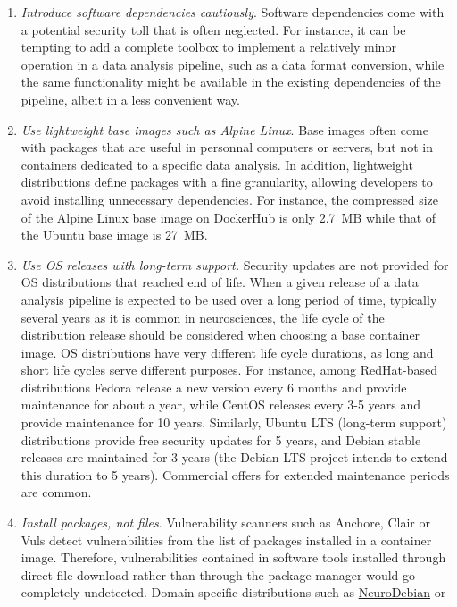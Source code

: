 \documentclass[a4paper,num-refs]{oup-contemporary}
\begin{document}
\begin{enumerate}[leftmargin=0pt,itemindent=*]
\item \emph{Introduce software dependencies cautiously}. Software
dependencies come with a potential security toll that is often neglected.
For instance, it can be tempting to add a complete toolbox to implement a
relatively minor operation in a data analysis pipeline, such as a data
format conversion, while the same functionality might be available in the
existing dependencies of the pipeline, albeit in a less convenient way.
\item \emph{Use lightweight base images such as Alpine Linux}. Base
images often come with packages that are useful in personnal computers or
servers, but not in containers dedicated to a specific data analysis. In
addition, lightweight distributions define packages with a fine
granularity, allowing developers to avoid installing unnecessary
dependencies. For instance, the compressed size of the Alpine Linux base
image on DockerHub is only 2.7~MB while that of the Ubuntu base image is
27~MB.
\item \emph{Use OS releases with long-term support.} Security updates are
not provided for OS distributions that reached end of life. When a given
release of a data analysis pipeline is expected to be used over a long
period of time, typically several years as it is common in neurosciences,
the life cycle of the distribution release should be considered when
choosing a base container image. OS distributions have very different life
cycle durations, as long and short life cycles serve different purposes.
For instance, among RedHat-based distributions Fedora release a new version
every 6 months and provide maintenance for about a year, while CentOS
releases every 3-5 years and provide maintenance for 10 years. Similarly,
Ubuntu LTS (long-term support) distributions provide free security updates
for 5 years, and Debian stable releases are maintained for 3 years (the
Debian LTS project intends to extend this duration to 5 years). Commercial
offers for extended maintenance periods are common. 
\item \emph{Install packages, not files}. Vulnerability scanners such as
Anchore, Clair or Vuls detect vulnerabilities from the list of packages
installed in a container image. Therefore, vulnerabilities contained in
software tools installed through direct file download rather than through
the package manager would go completely undetected. Domain-specific
distributions such as \href{http://neuro.debian.net}{NeuroDebian} or

\end{enumerate}
\end{document}
